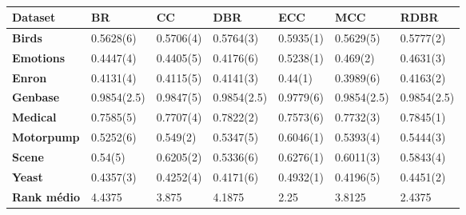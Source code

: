 \begin{table}[\tabmode]
\begin{tabular}{lllllll}
\hline
\textbf{Dataset}    & \textbf{BR} & \textbf{CC} & \textbf{DBR} & \textbf{ECC} & \textbf{MCC} & \textbf{RDBR} \\ \hline
\textbf{Birds}      & 0.5628(6)   & 0.5706(4)   & 0.5764(3)    & 0.5935(1)    & 0.5629(5)    & 0.5777(2)     \\
\textbf{Emotions}   & 0.4447(4)   & 0.4405(5)   & 0.4176(6)    & 0.5238(1)    & 0.469(2)     & 0.4631(3)     \\
\textbf{Enron}      & 0.4131(4)   & 0.4115(5)   & 0.4141(3)    & 0.44(1)      & 0.3989(6)    & 0.4163(2)     \\
\textbf{Genbase}    & 0.9854(2.5) & 0.9847(5)   & 0.9854(2.5)  & 0.9779(6)    & 0.9854(2.5)  & 0.9854(2.5)   \\
\textbf{Medical}    & 0.7585(5)   & 0.7707(4)   & 0.7822(2)    & 0.7573(6)    & 0.7732(3)    & 0.7845(1)     \\
\textbf{Motorpump}  & 0.5252(6)   & 0.549(2)    & 0.5347(5)    & 0.6046(1)    & 0.5393(4)    & 0.5444(3)     \\
\textbf{Scene}      & 0.54(5)     & 0.6205(2)   & 0.5336(6)    & 0.6276(1)    & 0.6011(3)    & 0.5843(4)     \\
\textbf{Yeast}      & 0.4357(3)   & 0.4252(4)   & 0.4171(6)    & 0.4932(1)    & 0.4196(5)    & 0.4451(2)     \\ \hline
\textbf{Rank médio} & 4.4375      & 3.875       & 4.1875       & 2.25         & 3.8125       & 2.4375        \\ \hline
\end{tabular}
\caption{\legendaTab{\EBA}{\jqo}}
\label{tab:EBAj48}
\end{table}